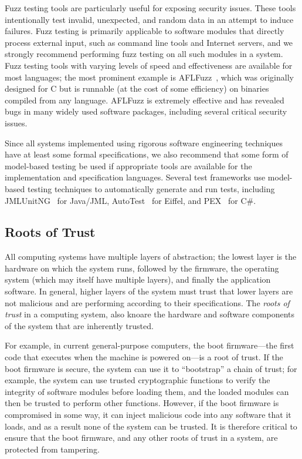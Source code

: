 Fuzz testing tools are particularly useful for exposing security
issues. These tools intentionally test invalid, unexpected, and random
data in an attempt to induce failures. Fuzz testing is primarily
applicable to software modules that directly process external input,
such as command line tools and Internet servers, and we strongly
recommend performing fuzz testing on all such modules in a
system. Fuzz testing tools with varying levels of speed and
effectiveness are available for most languages; the most prominent
example is AFLFuzz~\cite{AFLFuzz}, which was originally designed for C
but is runnable (at the cost of some efficiency) on binaries compiled
from any language. AFLFuzz is extremely effective and has revealed
bugs in many widely used software packages, including several critical
security issues.

Since all systems implemented using rigorous software engineering
techniques have at least some formal specifications, we also recommend
that some form of model-based testing be used if appropriate tools are
available for the implementation and specification languages. Several
test frameworks use model-based testing techniques to automatically
generate and run tests, including JMLUnitNG~\cite{ZimmermanNagmoti10}
for Java/JML, AutoTest~\cite{AutoTest10} for Eiffel, and
PEX~\cite{PEX08} for C\#.

\subsection{Roots of Trust}

All computing systems have multiple layers of abstraction; the lowest
layer is the hardware on which the system runs, followed by the
firmware, the operating system (which may itself have multiple
layers), and finally the application software. In general, higher
layers of the system must trust that lower layers are not malicious
and are performing according to their specifications. The \emph{roots
  of trust} in a computing system, also knoare the hardware and software
components of the system that are inherently trusted.

For example, in current general-purpose computers, the boot
firmware---the first code that executes when the machine is powered
on---is a root of trust. If the boot firmware is secure, the system
can use it to ``bootstrap'' a chain of trust; for example, the system
can use trusted cryptographic functions to verify the integrity of
software modules before loading them, and the loaded modules can then
be trusted to perform other functions. However, if the boot firmware
is compromised in some way, it can inject malicious code into any
software that it loads, and as a result none of the system can be
trusted. It is therefore critical to ensure that the boot firmware,
and any other roots of trust in a system, are protected from
tampering.


